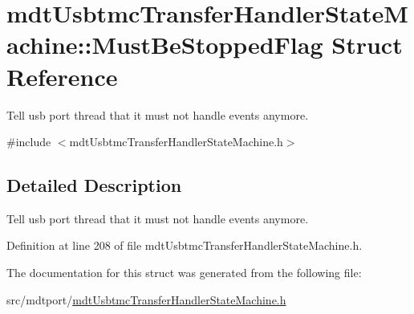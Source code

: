 \hypertarget{structmdt_usbtmc_transfer_handler_state_machine_1_1_must_be_stopped_flag}{\section{mdt\-Usbtmc\-Transfer\-Handler\-State\-Machine\-:\-:Must\-Be\-Stopped\-Flag Struct Reference}
\label{structmdt_usbtmc_transfer_handler_state_machine_1_1_must_be_stopped_flag}
}


Tell usb port thread that it must not handle events anymore.  




{\ttfamily \#include $<$mdt\-Usbtmc\-Transfer\-Handler\-State\-Machine.\-h$>$}



\subsection{Detailed Description}
Tell usb port thread that it must not handle events anymore. 

Definition at line 208 of file mdt\-Usbtmc\-Transfer\-Handler\-State\-Machine.\-h.



The documentation for this struct was generated from the following file\-:\begin{DoxyCompactItemize}
\item 
src/mdtport/\hyperlink{mdt_usbtmc_transfer_handler_state_machine_8h}{mdt\-Usbtmc\-Transfer\-Handler\-State\-Machine.\-h}\end{DoxyCompactItemize}
